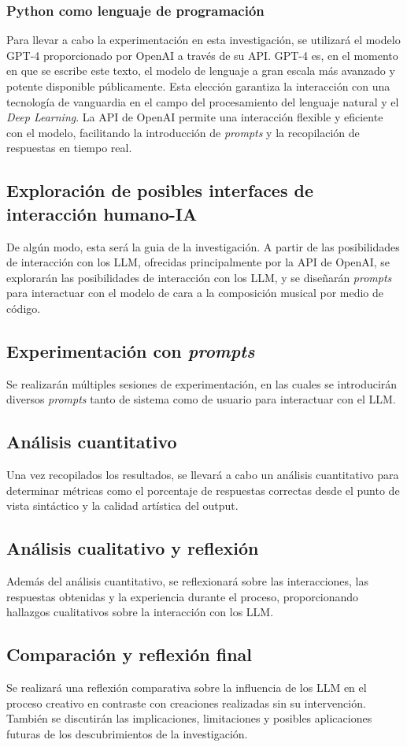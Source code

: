     \subsubsection{Python como lenguaje de programación}

Para llevar a cabo la experimentación en esta investigación, se utilizará el modelo GPT-4 proporcionado por OpenAI a través de su API. GPT-4 es, en el momento en que se escribe este texto, el modelo de lenguaje a gran escala más avanzado y potente disponible públicamente. Esta elección garantiza la interacción con una tecnología de vanguardia en el campo del procesamiento del lenguaje natural y el \textit{Deep Learning}. La API de OpenAI permite una interacción flexible y eficiente con el modelo, facilitando la introducción de \textit{prompts} y la recopilación de respuestas en tiempo real.

\subsection{Exploración de posibles interfaces de interacción humano-IA}
De algún modo, esta será la guia de la investigación. A partir de las posibilidades de interacción con los LLM, ofrecidas principalmente por la API de OpenAI, se explorarán las posibilidades de interacción con los LLM, y se diseñarán \textit{prompts} para interactuar con el modelo de cara a la composición musical por medio de código.


\subsection{Experimentación con \textit{prompts}}
Se realizarán múltiples sesiones de experimentación, en las cuales se introducirán diversos \textit{prompts} tanto de sistema como de usuario para interactuar con el LLM.

\subsection{Análisis cuantitativo}
Una vez recopilados los resultados, se llevará a cabo un análisis cuantitativo para determinar métricas como el porcentaje de respuestas correctas desde el punto de vista sintáctico y la calidad artística del output.

\subsection{Análisis cualitativo y reflexión}
Además del análisis cuantitativo, se reflexionará sobre las interacciones, las respuestas obtenidas y la experiencia durante el proceso, proporcionando hallazgos cualitativos sobre la interacción con los LLM.

\subsection{Comparación y reflexión final}
Se realizará una reflexión comparativa sobre la influencia de los LLM en el proceso creativo en contraste con creaciones realizadas sin su intervención. También se discutirán las implicaciones, limitaciones y posibles aplicaciones futuras de los descubrimientos de la investigación.